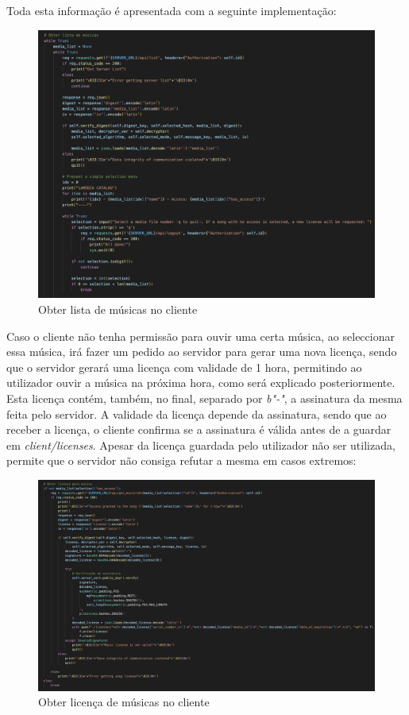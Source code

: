 \documentclass[10pt,english]{article}
\begin{document}
\par Toda esta informação é apresentada com a seguinte implementação:

\begin{figure}[!h]
        \centering
        \includegraphics[width=450]{images/get_list_client.png}
        \caption{Obter lista de músicas no cliente}
\end{figure}

\par Caso o cliente não tenha permissão para ouvir uma certa música, ao seleccionar essa música, irá fazer um pedido ao servidor para gerar uma nova licença, sendo que o servidor gerará uma licença com validade de 1 hora, permitindo ao utilizador ouvir a música na próxima hora, como será explicado posteriormente. Esta licença contém, também, no final, separado por \textit{b"-"}, a assinatura da mesma feita pelo servidor. A validade da licença depende da assinatura, sendo que ao receber a licença, o cliente confirma se a assinatura é válida antes de a guardar em \textit{client/licenses}. Apesar da licença guardada pelo utilizador não ser utilizada, permite que o servidor não consiga refutar a mesma em casos extremos:

\begin{figure}[!h]
        \centering
        \includegraphics[width=\textwidth]{images/get_license_client.png}
        \caption{Obter licença de músicas no cliente}
\end{figure}
\end{document}
